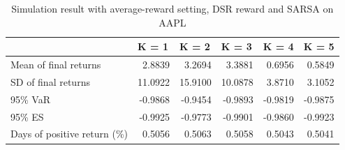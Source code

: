 \documentclass{article}
\begin{document}
\begin{table}[H]
\centering
\begin{tabular}{|l|r|r|r|r|r|} 
\hline
                             & \multicolumn{1}{l|}{K = 1} & \multicolumn{1}{l|}{K = 2} & \multicolumn{1}{l|}{K = 3} & \multicolumn{1}{l|}{K = 4} & \multicolumn{1}{l|}{K = 5}  \\ 
\hline
Mean of final returns        & 2.8839                     & 3.2694                     & 3.3881                     & 0.6956                     & 0.5849                      \\ 
\hline
SD of final returns          & 11.0922                    & 15.9100                    & 10.0878                    & 3.8710                     & 3.1052                      \\ 
\hline
95\% VaR                     & -0.9868                    & -0.9454                    & -0.9893                    & -0.9819                    & -0.9875                     \\ 
\hline
95\% ES                      & -0.9925                    & -0.9773                    & -0.9901                    & -0.9860                    & -0.9923                     \\ 
\hline
Days of positive return (\%) & 0.5056                     & 0.5063                     & 0.5058                     & 0.5043                     & 0.5041                      \\
\hline
\end{tabular}
\caption{Simulation result with average-reward setting, DSR reward and SARSA on AAPL}
\label{table7}
\end{table}
\end{document}
